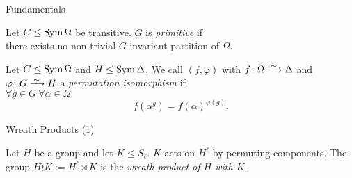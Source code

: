 \begin{frame}{Fundamentals}
    \begin{defn}
        Let $G \leq \operatorname{Sym} \Omega$ be transitive.
        $G$ is \emph{primitive} if
        \\
        there exists no non-trivial
        $G$-invariant partition of $\Omega$.
    \end{defn}
    \pause

    \begin{defn}
        Let $G \leq \operatorname{Sym} \Omega$ and $H \leq \operatorname{Sym} \Delta$.
        We call $(f, \varphi)$ with
        $f \from \Omega \iso \Delta$
        and
        $\varphi \from G \iso H$
        a \emph{permutation isomorphism}
        if
        \\
        \pause
        $\forall g \in G ~ \forall \alpha \in \Omega :$
        \[
            f(\alpha ^ g) = f(\alpha) ^ {\varphi(g)}.
        \]
    \end{defn}
\end{frame}


\begin{frame}{Wreath Products (1)}
    \begin{defn}
        Let $H$ be a group and let $K \leq S_\ell$.
        $K$ acts on $H ^ \ell$ by permuting components.
        \pause
        The group
        $H \wr K := H ^ \ell \rtimes K$
        is the \emph{wreath product of $H$ with $K$}.
    \end{defn}
\end{frame}

